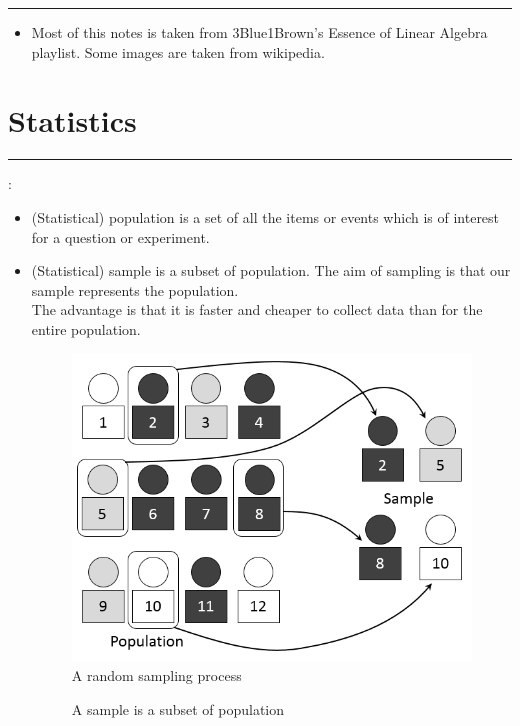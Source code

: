 \documentclass[	DIV=calc,%
paper=a4,%
fontsize=11pt,%
twocolumn]{scrartcl} %
\newcommand{\hformbar}[1]{\vspace{5pt}\hrule\vspace{10pt}} %
\newcommand{\formdesc}[1]{\noindent\textbf{#1}}
\begin{document}
\hformbar
\formdesc{Credits:}
\begin{itemize}
	\item Most of this notes is taken from 3Blue1Brown's Essence of Linear Algebra playlist. Some images are taken from wikipedia.
\end{itemize}

\newpage
\section{Statistics}


\hformbar

\formdesc{Population and Sample}: 
\begin{itemize}
	\item (Statistical) population is a set of all the items or events which is of interest for a question or experiment.
	\item (Statistical) sample is a subset of population. The aim of sampling is that our sample represents the population.\\ The advantage is that it is faster and cheaper to collect data than for the entire population.
	
	\begin{figure}[ht!]
		\caption{A random sampling process}
		\graphicspath{ {images/math/} }
		\includegraphics[width=\linewidth]{simple_random_sampling}
	\end{figure}
\bigskip
	\begin{figure}[ht!]
		\centering
		\caption{A sample is a subset of population}
	\end{figure}
\end{itemize}
\end{document}
